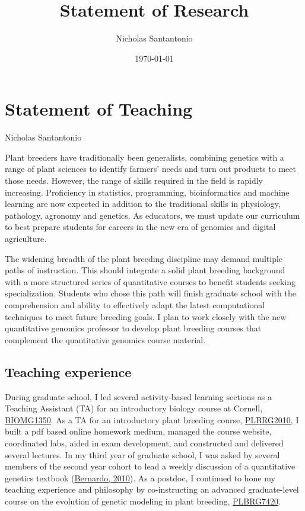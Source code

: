 \documentclass[11pt]{article}
\title{Statement of Research}
\author{Nicholas Santantonio}
\date{\today}
\begin{document}
\section*{\centering Statement of Teaching}
\begin{center} Nicholas Santantonio \end{center}

\noindent Plant breeders have traditionally been generalists, combining genetics with a range of plant sciences to identify farmers' needs and turn out products to meet those needs. However, the range of skills required in the field is rapidly increasing. Proficiency in statistics, programming, bioinformatics and machine learning are now expected in addition to the traditional skills in physiology, pathology, agronomy and genetics. As educators, we must update our curriculum to best prepare students for careers in the new era of genomics and digital agriculture. 

The widening breadth of the plant breeding discipline may demand multiple paths of instruction. This should integrate a solid plant breeding background with a more structured series of quantitative courses to benefit students seeking specialization. Students who chose this path will finish graduate school with the comprehension and ability to effectively adapt the latest computational techniques to meet future breeding goals. I plan to work closely with the new quantitative genomics professor to develop plant breeding courses that complement the quantitative genomics course material.

\subsection*{Teaching experience}

During graduate school, I led several activity-based learning sections as a Teaching Assistant (TA) for an introductory biology course at Cornell, \href{https://classes.cornell.edu/browse/roster/SP19/class/BIOMG/1350}{BIOMG1350}. As a TA for an introductory plant breeding course, \href{https://classes.cornell.edu/browse/roster/FA17/class/PLBRG/2010}{PLBRG2010}, I built a pdf based online homework medium, managed the course website, coordinated labs, aided in exam development, and constructed and delivered several lectures. In my third year of graduate school, I was asked by several members of the second year cohort to lead a weekly discussion of a quantitative genetics textbook (\href{http://stemmapress.com/}{Bernardo, 2010}). As a postdoc, I continued to hone my teaching experience and philosophy by co-instructing an advanced graduate-level course on the evolution of genetic modeling in plant breeding, \href{https://classes.cornell.edu/browse/roster/FA19/class/PLBRG/7420}{PLBRG7420}.
\end{document}

